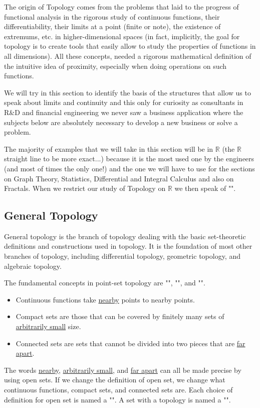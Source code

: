 	The origin of Topology comes from the problems that laid to the progress of functional analysis in the rigorous study of continuous functions, their differentiability, their limits at a point (finite or note), the existence of extremums, etc. in higher-dimensional spaces (in fact, implicitly, the goal for topology is to create tools that easily allow to study the properties of functions in all dimensions). All these concepts, needed a rigorous mathematical definition of the intuitive idea of proximity, especially when doing operations on such functions.

	We will try in this section to identify the basis of the structures that allow us to speak about limits and continuity and this only for curiosity as consultants in R\&D and financial engineering we never saw a business application where the subjects below are absolutely necessary to develop a new business or solve a problem. 
	
	The majority of examples that we will take in this section will be in $\mathbb{R}$ (the $\mathbb{R}$ straight line to be more exact...) because it is the most used one by the engineers (and most of times the only one!) and the one we will have to use for the sections on Graph Theory, Statistics, Differential and Integral Calculus and also on Fractals. When we restrict our study of Topology on $\mathbb{R}$ we then speak of "".

	\subsection{General Topology}

General topology is the branch of topology dealing with the basic set-theoretic definitions and constructions used in topology. It is the foundation of most other branches of topology, including differential topology, geometric topology, and algebraic topology.

The fundamental concepts in point-set topology are "", "", and "".  
	\begin{itemize}
		\item Continuous functions take \underline{nearby} points to nearby points.
		
		\item Compact\label{compact} sets are those that can be covered by finitely many sets of \underline{arbitrarily small} size. 
		
		\item Connected sets are sets that cannot be divided into two pieces that are \underline{far apart}. 
	\end{itemize}		
	The words \underline{nearby}, \underline{arbitrarily small}, and \underline{far apart} can all be made precise by using open sets. If we change the definition of open set, we change what continuous functions, compact sets, and connected sets are. Each choice of definition for open set is named a "". A set with a topology is named a "\label{topological space}".

